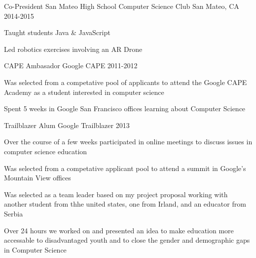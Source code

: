 \begin{cventries}
  \cventry
    {Co-President}
    {San Mateo High School Computer Science Club}
    {San Mateo, CA}
    {2014-2015}
    {
      \begin{cvitems}
        \item {Taught students Java \& JavaScript}
        \item {Led robotics exercises involving an AR Drone}
      \end{cvitems}
    }
  \cventry
    {CAPE Ambasador}
    {Google CAPE}
    {}
    {2011-2012}
    {
      \begin{cvitems}
        \item {Was selected from a competative pool of applicants to attend the Google CAPE Academy as a student interested in computer science}
        \item {Spent 5 weeks in Google San Francisco offices learning about Computer Science}
        \item {}
      \end{cvitems}
    }
  \cventry
    {Trailblazer Alum}
    {Google Trailblazer}
    {}
    {2013}
    {
      \begin{cvitems}
        \item {Over the course of a few weeks participated in online meetings to discuss issues in computer science education}
        \item {Was selected from a competative applicant pool to attend a summit in Google's Mountain View offices}
        \item {Was selected as a team leader based on my project proposal working with another student from thhe united states, one from Irland, and an educator from Serbia}
        \item {Over 24 hours we worked on and presented an idea to make education more accessable to disadvantaged youth and to close the gender and demographic gaps in Computer Science}
      \end{cvitems}
    }
\end{cventries}

